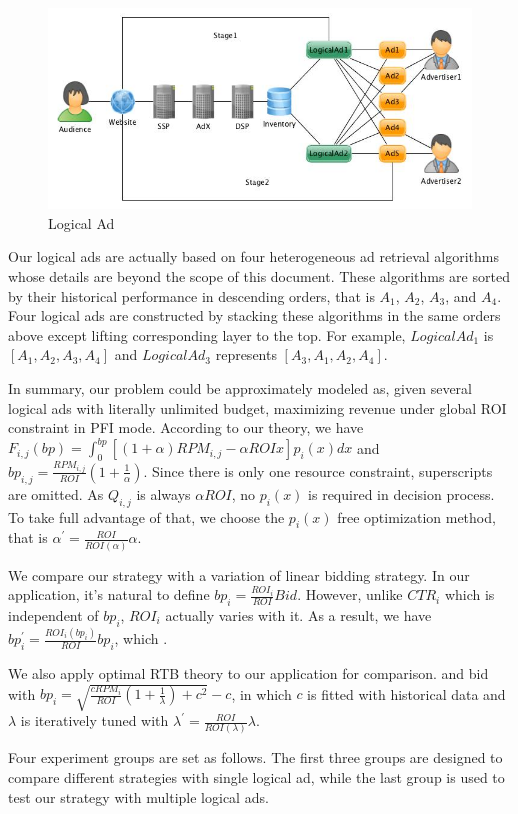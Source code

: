 \documentclass[sigconf]{acmart}
\newcommand{\sbp}{bp_{i,j}}
\newcommand{\sRPM}{RPM_{i,j}}
\newcommand{\sF}{F_{i,j}}
\newcommand{\ortbbp}{\sqrt{\frac{cRPM_i}{ROI}(1+\frac{1}{\lambda})+c^2}-c}
\newcommand{\dbbp}{\frac{\sRPM}{ROI}(1+\frac{1}{\alpha})}
\newcommand{\liniter}{bp_i^{'}=\frac{ROI_i(bp_i)}{ROI}bp_i}
\newcommand{\ortbiter}{\lambda^{'}=\frac{ROI}{ROI(\lambda)}\lambda}
\newcommand{\dbiter}{\alpha^{'} = \frac{ROI}{ROI(\alpha)}\alpha}
\begin{document}
\begin{figure}[!h]
\centering
\includegraphics[width=0.6\linewidth]{./LogicalAd.jpg}
\caption{Logical Ad}
\end{figure}

Our logical ads are actually based on four heterogeneous ad retrieval algorithms whose details are beyond the scope of this document.
These algorithms are sorted by their historical performance in descending orders, that is $A_1$, $A_2$, $A_3$, and $A_4$.
Four logical ads are constructed by stacking these algorithms in the same orders above except lifting corresponding layer to the top.
For example, $LogicalAd_1$ is $[A_1, A_2, A_3, A_4]$ and $LogicalAd_3$ represents $[A_3, A_1, A_2, A_4]$.

In summary, our problem could be approximately modeled as, given several logical ads with literally unlimited budget,
    maximizing revenue under global ROI constraint in PFI mode.
According to our theory, we have $\sF(bp) = \int_0^{bp} [(1+\alpha)\sRPM - \alpha{}ROIx]p_i(x)dx$
    and $\sbp=\dbbp$.
Since there is only one resource constraint, superscripts are omitted.
As $Q_{i,j}$ is always $\alpha{}ROI$, no $p_i(x)$ is required in decision process.
To take full advantage of that, we choose the $p_i(x)$ free optimization method,
    that is $\dbiter$.

We compare our strategy with a variation of linear bidding strategy.
In our application, it's natural to define $bp_i=\frac{ROI_i}{ROI}Bid$.
However, unlike $CTR_i$ which is independent of $bp_i$, $ROI_i$ actually varies with it.
As a result, we have $\liniter$,
    which .

We also apply optimal RTB theory to our application for comparison.
    and bid with $bp_i=\ortbbp$,
    in which $c$ is fitted with historical data
    and $\lambda$ is iteratively tuned with $\ortbiter$.

Four experiment groups are set as follows.
The first three groups are designed to compare different strategies with single logical ad,
    while the last group is used to test our strategy with multiple logical ads.
\end{document}
